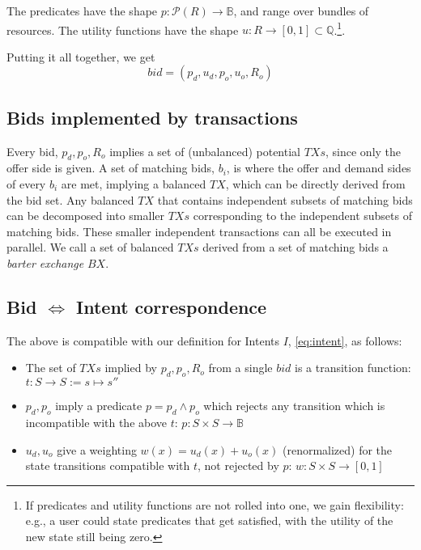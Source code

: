 The predicates have the shape $p : \mathcal{P}(R) \to \mathbb{B}$, and range over bundles of resources.
The utility functions have the shape $u : R \to [0, 1] \subset \mathbb{Q}$.\footnote{If predicates and utility functions are not rolled into one, we gain flexibility: e.g., a user could state predicates that get satisfied, with the utility of the new state still being zero.}.

Putting it all together, we get
\begin{equation}
    bid = (p_d, u_d, p_o, u_o, R_o)
\end{equation}


\subsection{Bids implemented by transactions}
Every bid, $p_d, p_o, R_o$ implies a set of (unbalanced)  potential $TXs$, since only the offer side is given. A set of matching bids, $b_i$, is where the offer and demand sides of every $b_i$ are met, implying a balanced $TX$, which can be directly derived from the bid set. Any balanced $TX$ that contains independent subsets of matching bids can be decomposed into smaller $TXs$ corresponding to the independent subsets of matching bids. These smaller independent transactions can all be executed in parallel. We call a set of balanced $TXs$ derived from a set of matching bids a \textit{barter exchange} $BX$. 

\subsection{Bid $\Leftrightarrow$ Intent correspondence}
The above is compatible with our definition for Intents $I$, \eqref{eq:intent},
as follows: 

\begin{itemize}
    \item The set of $TXs$ implied by $p_d, p_o, R_o$ from a single $bid$ is a transition function: $t: S \to S := s \mapsto s''$ 
    \item $p_d, p_o$ imply a predicate $p = p_d \land p_o$ which rejects any transition which is incompatible with the above $t$: $p : S \times S \to \mathbb{B}$
    \item $u_d, u_o$ give a weighting $w(x) = u_d(x) + u_o(x)$ (renormalized) for the state transitions compatible with $t$, not rejected by $p$: $w: S \times S \to [0, 1]$
\end{itemize}

